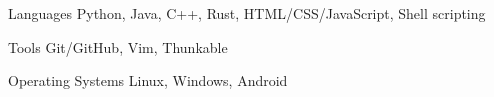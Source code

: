 
\begin{cvskills}
  \cvskill
    {Languages} %
    {Python, Java, C++, Rust, HTML/CSS/JavaScript, Shell scripting} %

  \cvskill
    {Tools}
    {Git/GitHub, Vim, Thunkable}
    
  \cvskill
    {Operating Systems}
    {Linux, Windows, Android}
\end{cvskills}
